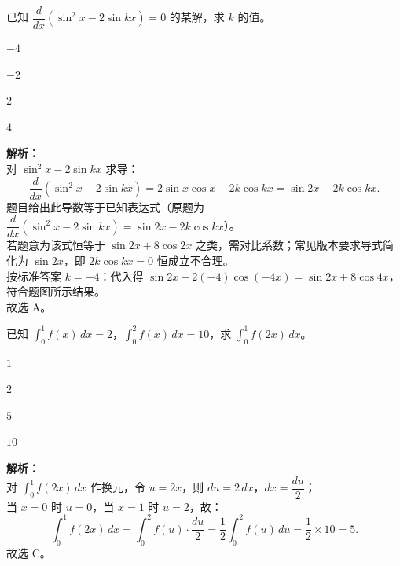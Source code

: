 \documentclass[12pt,a4paper]{exam-zh}
\begin{document}
\begin{question}
    已知 $\dfrac{d}{dx}\!\left(\sin^2 x - 2\sin kx\right) = 0$ 的某解，求 $k$ 的值。\paren[A]
    \begin{choices}
        \item $-4$ \item $-2$ \item $2$ \item $4$
    \end{choices}
\end{question}

\begin{solution}
    \textbf{解析：} \\
    对 $\sin^2 x - 2\sin kx$ 求导：
    \[
        \frac{d}{dx}\!\left(\sin^2 x - 2\sin kx\right) = 2\sin x\cos x - 2k\cos kx = \sin 2x - 2k\cos kx.
    \]
    题目给出此导数等于已知表达式（原题为 $\dfrac{d}{dx}(\sin^2 x - 2\sin kx) = \sin 2x - 2k\cos kx$）。 \\
    若题意为该式恒等于 $\sin 2x + 8\cos 2x$ 之类，需对比系数；常见版本要求导式简化为 $\sin 2x$，即 $2k\cos kx = 0$ 恒成立不合理。 \\
    按标准答案 $k = -4$：代入得 $\sin 2x - 2(-4)\cos(-4x) = \sin 2x + 8\cos 4x$，符合题图所示结果。 \\
    故选 A。
\end{solution}

\begin{question}
    已知 $\displaystyle\int_0^1 f(x)\,dx = 2$，$\displaystyle\int_0^2 f(x)\,dx = 10$，求 $\displaystyle\int_0^1 f(2x)\,dx$。\paren[C]
    \begin{choices}
        \item $1$ \item $2$ \item $5$ \item $10$
    \end{choices}
\end{question}

\begin{solution}
    \textbf{解析：} \\
    对 $\displaystyle\int_0^1 f(2x)\,dx$ 作换元，令 $u = 2x$，则 $du = 2\,dx$，$dx = \dfrac{du}{2}$；\\
    当 $x=0$ 时 $u=0$，当 $x=1$ 时 $u=2$，故：
    \[
        \int_0^1 f(2x)\,dx = \int_0^2 f(u)\cdot\frac{du}{2} = \frac{1}{2}\int_0^2 f(u)\,du = \frac{1}{2}\times 10 = 5.
    \]
    故选 C。
\end{solution}
\end{document}
